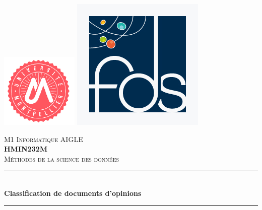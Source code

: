 \documentclass[12pt,a4paper]{report}
\theoremstyle{definition}
\begin{document}
\begin{titlepage}
\newcommand{\HRule}{\rule{\linewidth}{0.5mm}} %
\center

\includegraphics[scale=0.5]{images/logos/umLogo.png} %
\hspace{\fill}
\includegraphics[scale=0.25]{images/logos/fdsLogo.jpg} %

\textsc{\LARGE M1 Informatique AIGLE}\\[1cm]
\textsc{\Large \textbf{HMIN232M}}\\[0.25cm]
\textsc{\large Méthodes de la science des données}\\[0.5cm]

\HRule \\[0.4cm]
{ \huge \bfseries Classification de documents d'opinions}\\[0.4cm]
\HRule \\[0.5cm]


\end{titlepage}
\end{document}
